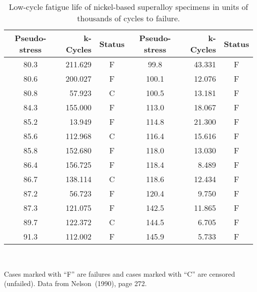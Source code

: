 \begin{table}
\caption{Low-cycle fatigue life of nickel-based superalloy specimens
in units of thousands of cycles to failure.}
\centering\small
\begin{tabular}{crc@{\hspace{3em}}crc}
\\[-.5ex] \hline
Pseudo-stress &  k-Cycles & Status & Pseudo-stress & k-Cycles & Status \\
\hline 80.3 & 211.629 & F & 99.8 & 43.331 & F \\ 80.6 & 200.027 & F &
100.1 & 12.076 & F \\ 80.8 & 57.923 & C & 100.5 & 13.181 & F \\ 84.3 &
155.000 & F & 113.0 & 18.067 & F \\ 85.2 & 13.949 & F & 114.8 & 21.300
& F \\ 85.6 & 112.968 & C & 116.4 & 15.616 & F \\ 85.8 & 152.680 & F &
118.0 & 13.030 & F \\ 86.4 & 156.725 & F & 118.4 & 8.489 & F \\ 86.7 &
138.114 & C & 118.6 & 12.434 & F \\ 87.2 & 56.723 & F & 120.4 & 9.750
& F \\ 87.3 & 121.075 & F & 142.5 & 11.865 & F \\ 89.7 & 122.372 & C &
144.5 & 6.705 & F \\ 91.3 & 112.002 & F & 145.9 & 5.733 & F \\ \hline
\end{tabular}\\
\begin{minipage}[t]{4in}
Cases marked with ``F'' are failures and cases marked with ``C'' are
censored (unfailed). Data from Nelson~(1990), page 272.
\end{minipage}
\label{atable:super.alloy.data}
\end{table}


